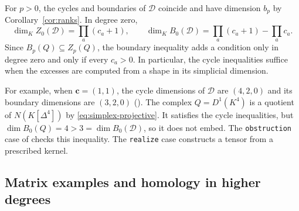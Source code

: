 For $p>0$, the cycles and boundaries of $\mathcal D$ coincide and have
dimension $b_p$ by Corollary~\ref{cor:ranks}. In degree zero,
\[
 \dim_K Z_0(\mathcal D)=\prod_a(c_a+1),\qquad
 \dim_K B_0(\mathcal D)=\prod_a(c_a+1)-\prod_a c_a.
\]
Since $B_p(Q)\subseteq Z_p(Q)$, the boundary inequality adds a condition
only in degree zero and only if every $c_a>0$. In particular, the cycle
inequalities suffice when the excesses are computed from a shape in its simplicial dimension.

For example, when $\mathbf c=(1,1)$, the cycle dimensions
of $\mathcal D$ are $(4,2,0)$ and its boundary dimensions are $(3,2,0)$
().
The complex $Q=D^1(K^4)$ is a quotient of $N(K[\Delta^4])$ by
\eqref{eq:simplex-projective}. It satisfies the cycle inequalities,
but $\dim B_0(Q)=4>3=\dim B_0(\mathcal D)$, so it does not embed.
The \texttt{obstruction} case of 
checks this inequality. The \texttt{realize} case constructs a tensor from a prescribed kernel.

\subsection{Matrix examples and homology in higher degrees}

